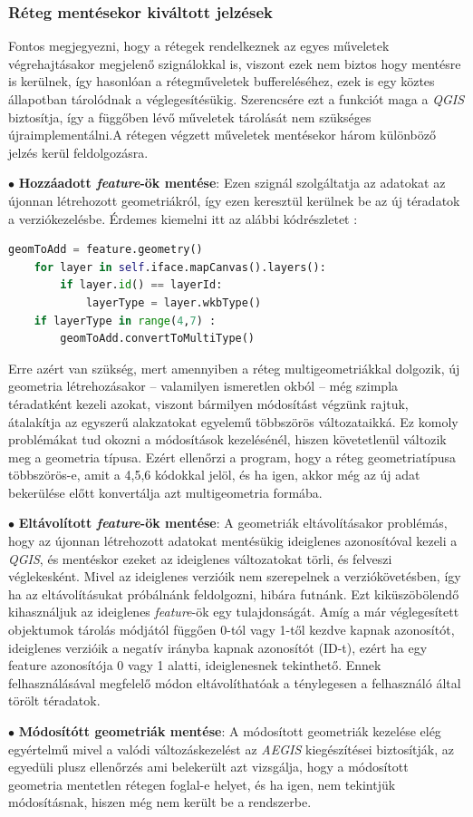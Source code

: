 \subsubsection{Réteg mentésekor kiváltott jelzések}
Fontos megjegyezni, hogy a rétegek rendelkeznek az egyes műveletek végrehajtásakor megjelenő szignálokkal is, viszont ezek nem biztos hogy mentésre is kerülnek, így hasonlóan a rétegműveletek buffereléséhez, ezek is egy köztes állapotban tárolódnak a véglegesítésükig. Szerencsére ezt a funkciót maga a \emph{QGIS} biztosítja, így a függőben lévő műveletek tárolását nem szükséges újraimplementálni.A rétegen végzett műveletek mentésekor három különböző jelzés kerül feldolgozásra.
\begin{list}{}{}
	\item $\bullet$ \textbf{Hozzáadott \emph{feature}-ök mentése}: Ezen szignál szolgáltatja az adatokat az újonnan létrehozott geometriákról, így ezen keresztül kerülnek be az új téradatok a verziókezelésbe. Érdemes kiemelni itt az alábbi kódrészletet : 
	\begin{lstlisting}[language={python}]
	geomToAdd = feature.geometry()
	for layer in self.iface.mapCanvas().layers():
		if layer.id() == layerId:
			layerType = layer.wkbType()
	if layerType in range(4,7) :
		geomToAdd.convertToMultiType()
	\end{lstlisting}
	Erre azért van szükség, mert amennyiben a réteg multigeometriákkal dolgozik, új geometria létrehozásakor -- valamilyen ismeretlen okból -- még szimpla téradatként kezeli azokat, viszont bármilyen módosítást végzünk rajtuk, átalakítja az egyszerű alakzatokat egyelemű többszörös változataikká. Ez komoly problémákat tud okozni a módosítások kezelésénél, hiszen követetlenül változik meg a geometria típusa. Ezért ellenőrzi a program, hogy a réteg geometriatípusa többszörös-e, amit a 4,5,6 kódokkal jelöl, és ha igen, akkor még az új adat bekerülése előtt konvertálja azt multigeometria formába.
	\item $\bullet$ \textbf{Eltávolított \emph{feature}-ök mentése}: A geometriák eltávolításakor problémás, hogy az újonnan létrehozott adatokat mentésükig ideiglenes azonosítóval kezeli a \emph{QGIS}, és mentéskor ezeket az ideiglenes változatokat törli, és felveszi véglekesként. Mivel az ideiglenes verzióik nem szerepelnek a verziókövetésben, így ha az eltávolításukat próbálnánk feldolgozni, hibára futnánk. Ezt kiküszöbölendő kihasználjuk az ideiglenes \emph{feature}-ök egy tulajdonságát. Amíg a már véglegesített objektumok tárolás módjától függően 0-tól vagy 1-től kezdve kapnak azonosítót, ideiglenes verzióik a negatív irányba kapnak azonosítót (ID-t), ezért ha egy feature azonosítója 0 vagy 1 alatti, ideiglenesnek tekinthető. Ennek felhasználásával megfelelő módon eltávolíthatóak a ténylegesen a felhasználó által törölt téradatok.
	\item $\bullet$ \textbf{Módosítótt geometriák mentése}: A módosított geometriák kezelése elég egyértelmű mivel a valódi változáskezelést az \emph{AEGIS} kiegészítései biztosítják, az egyedüli plusz ellenőrzés ami belekerült azt vizsgálja, hogy a módosított geometria mentetlen rétegen foglal-e helyet, és ha igen, nem tekintjük módosításnak, hiszen még nem került be a rendszerbe.

\end{list}
